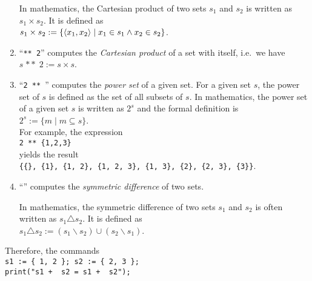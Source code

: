 \begin{enumerate}
      In mathematics, the Cartesian product of two sets $s_1$ and $s_2$ is written
      as $s_1 \times s_2$.  It is defined as
      \\[0.2cm]
      \hspace*{1.3cm}
      $s_1 \times s_2 := \{ \pair(x_1,x_2) \mid x_1 \in s_1 \wedge x_2 \in s_2 \}$.
\item ``\texttt{** 2}'' computes the \emph{Cartesian product} of a set with itself,
      i.e.~we have 
      \\[0.2cm]
      \hspace*{1.3cm}
      $s \;\mathtt{**}\; 2 := s \times s$.
\item ``\texttt{2 ** }'' computes the \emph{power set} of a given set.  For a given set
      $s$, the power set of $s$ is defined as the set of all subsets of $s$.
      In mathematics, the power set of a given set $s$ is written as $2^s$ and the formal
      definition is
      \\[0.2cm]
      \hspace*{1.3cm}
      $2^s := \{ m \mid m \subseteq s \}$.
      \\[0.2cm]
      For example, the expression
      \\[0.2cm]
      \hspace*{1.3cm}
      \texttt{2 ** \{1,2,3\}}
      \\[0.2cm]
      yields the result
      \\[0.2cm]
      \hspace*{1.3cm}
      \texttt{\{\{\}, \{1\}, \{1, 2\}, \{1, 2, 3\}, \{1, 3\}, \{2\}, \{2, 3\}, \{3\}\}}.
\item ``\texttt{}'' computes the \emph{symmetric difference} of two sets.

      In mathematics, the symmetric difference of two sets $s_1$ and $s_2$ is often written
      as $s_1 \triangle s_2$.  It is defined as
      \\[0.2cm]
      \hspace*{1.3cm}
      $s_1 \triangle s_2 := (s_1 \backslash s_2) \cup (s_2 \backslash s_1)$.
\end{enumerate}
Therefore, the commands
\\[0.2cm]
\hspace*{1.3cm}
\texttt{s1 := \{ 1, 2 \}; s2 := \{ 2, 3 \};}
\\
\hspace*{1.3cm}
\texttt{print("s1 + \ s2 = s1 + \ s2");}
\\
\hspace*{1.3cm}
